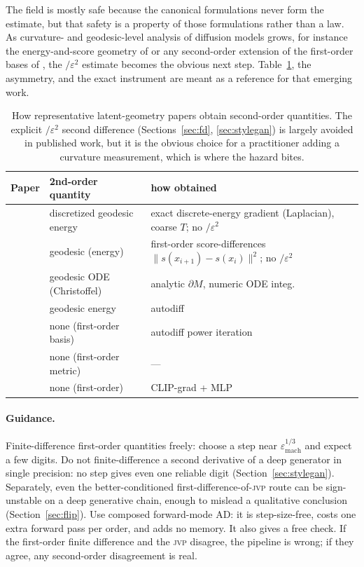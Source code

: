 \documentclass[10pt]{article} %
\newcommand{\jvp}{\textsc{jvp}}
\newcommand{\eps}{\varepsilon}
\begin{document}
The field is mostly safe because the canonical formulations never form the
estimate, but that safety is a property of those formulations rather than a law. As curvature- and
geodesic-level analysis of diffusion models grows, for instance the
energy-and-score geometry of \citet{saito2025,saito2025b} or any second-order extension of
the first-order bases of \citet{park2023}, the $/\eps^2$ estimate becomes the
obvious next step. Table~\ref{tab:survey}, the asymmetry, and the exact instrument
are meant as a reference for that emerging work.

\begin{table}[h]\centering
\begin{tabular}{>{\raggedright}p{4.4cm} l p{3.6cm}}
\toprule
Paper & 2nd-order quantity & how obtained \\
\midrule
\citet{shao2018} & discretized geodesic energy &
exact discrete-energy gradient (Laplacian), coarse $T$; no $/\eps^2$ \\
\citet{saito2025} & geodesic (energy) & first-order score-differences $\|s(x_{i+1}){-}s(x_i)\|^2$; no $/\eps^2$ \\
\citet{arvanitidis2018} & geodesic ODE (Christoffel) & analytic $\partial M$, numeric ODE integ. \\
\citet{yang2018} & geodesic energy & autodiff \\
\citet{park2023} & none (first-order basis) & autodiff power iteration \\
\citet{chen2018} & none (first-order metric) & --- \\
\citet{kwon2023} & none (first-order) & CLIP-grad + MLP \\
\bottomrule
\end{tabular}
\caption{How representative latent-geometry papers obtain second-order quantities.
The explicit $/\eps^2$ second difference (Sections~\ref{sec:fd},
\ref{sec:stylegan}) is largely avoided in published work, but it is the obvious
choice for a practitioner adding a curvature measurement, which is where the
hazard bites.}
\label{tab:survey}
\end{table}

\paragraph{Guidance.} Finite-difference first-order quantities freely: choose a
step near $\eps_{\mathrm{mach}}^{1/3}$ and expect a few digits. Do not
finite-difference a second derivative of a deep generator in single precision: no
step gives even one reliable digit (Section~\ref{sec:stylegan}). Separately, even
the better-conditioned first-difference-of-\jvp{} route can be sign-unstable on a
deep generative chain, enough to mislead a qualitative conclusion
(Section~\ref{sec:flip}). Use composed forward-mode AD: it is step-size-free, costs
one extra forward pass per order, and adds no memory. It also gives a free check. If the first-order finite difference and the
\jvp{} disagree, the pipeline is wrong; if they agree, any second-order
disagreement is real.
\end{document}
